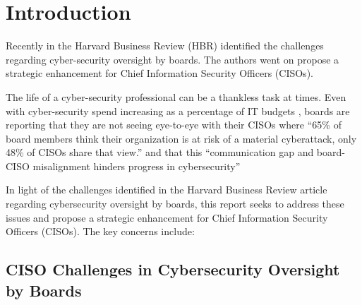 \section{Introduction}

Recently in the Harvard Business Review (HBR) \textcite{Milica:2023} identified the challenges regarding cyber-security oversight by boards.  The
authors went on propose a strategic enhancement for Chief Information Security Officers (CISOs).

The life of a cyber-security professional can be a thankless task at times. Even with cyber-security spend increasing as a percentage of IT
budgets \autocite{Hiscox:2022}, boards are reporting that they are not seeing eye-to-eye with their CISOs where \enquote{65\% of board members
  think their organization is at risk of a material cyberattack, only 48\% of CISOs share that view.} and that
this \enquote{communication gap and board-CISO misalignment hinders progress in cybersecurity} 

In light of the challenges identified in the Harvard Business Review article regarding cybersecurity oversight by boards, this report seeks to address these issues and propose a strategic enhancement for Chief Information Security Officers (CISOs). The key concerns include:

\subsection{CISO Challenges in Cybersecurity Oversight by Boards}

